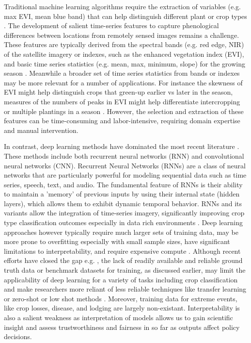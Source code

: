 \documentclass[journal]{IEEEtran}
\begin{document}
Traditional machine learning algorithms require the extraction of variables (e.g. max EVI, mean blue band) that can help distinguish different plant or crop types \cite{begue2018remote}. The development of salient time-series features to capture phenological differences between locations from remotely sensed images remains a challenge. These features are typically derived from the spectral bands (e.g. red edge, NIR) of the satellite imagery or indexes, such as the enhanced vegetation index (EVI), and basic time series statistics (e.g. mean, max, minimum, slope) for the growing season \cite{morton2006cropland}. Meanwhile a broader set of time series statistics from bands or indexes may be more relevant for a number of applications. For instance the skewness of EVI might help distinguish crops that green-up earlier vs later in the season, measures of the numbers of peaks in EVI might help differentiate intercropping or multiple plantings in a season \cite{begue2018remote}. However, the selection and extraction of these features can be time-consuming and labor-intensive, requiring domain expertise and manual intervention.

In contrast, deep learning methods have dominated the most recent literature \cite{agriculture13050965, @hohl2024recent}. These methods include both recurrent neural networks (RNN) and convolutional neural networks (CNN). Recurrent Neural Networks (RNNs) are a class of neural networks that are particularly powerful for modeling sequential data such as time series, speech, text, and audio. The fundamental feature of RNNs is their ability to maintain a 'memory' of previous inputs by using their internal state (hidden layers), which allows them to exhibit dynamic temporal behavior. RNNs and its variants allow the integration of time-series imagery, significantly improving crop type classification outcomes especially in data rich environments \cite{agriculture13050965, camps2021deep}. Deep learning approaches however typically require much larger sets of training data, may be more prone to overfitting especially with small sample sizes, have significant limitations to interpretability, and require expensive compute \cite{hohl2024recent, rs13132591, agriculture13050965, LI2023103345, MA2019166}. Although recent efforts have closed the gap e.g. \cite{tseng2021cropharvest}, the lack of readily available and reliable ground truth data or benchmark datasets for training, as discussed earlier, may limit the applicability of deep learning for a variety of tasks including crop classification and make researchers more reliant of less reliable techniques like transfer learning or zero-shot or low shot methods \cite{owusu2024towards, LI2023103345, MA2019166}. Moreover, training data for extreme events, like crop losses, disease, and lodging are largely non-existant.  Interpretability is also a salient weakness as interpretation of models allows us to gain scientific insight and assess trustworthiness and fairness in so far as outputs affect policy decisions.  
\end{document}
